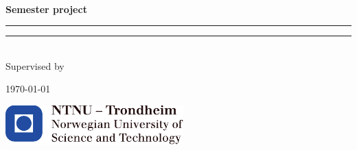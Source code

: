 \begin{titlepage}

\begin{center}
    
    ~\\[2.0cm]
    
    \Large \textbf{Semester project}\\[2.5cm]
     
    \hrule
    {\LARGE \mytitle}	%
    \vspace{0.5cm}
    \hrule
    
    \vspace{1.0cm}
    
    \LARGE \textbf{\myauthor}\\[2.5cm]
    
    \Large Supervised by\par
	\textbf{\mysupervisor}
    
    \vfill
    {\large \today}
    
    \vspace{1.0cm}
    
    \includegraphics[height=1.5cm]{images/ntnu_logo.pdf}
    
\end{center}


\end{titlepage}